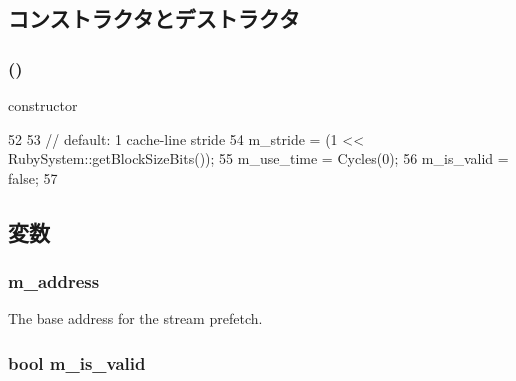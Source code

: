 \subsection{コンストラクタとデストラクタ}
\hypertarget{classPrefetchEntry_a50ec5ab4d2e06f3dbfd82cc2590a574d}{
\subsubsection[{PrefetchEntry}]{ ()}}
\label{classPrefetchEntry_a50ec5ab4d2e06f3dbfd82cc2590a574d}


constructor 


\begin{DoxyCode}
52         {
53             // default: 1 cache-line stride
54             m_stride   = (1 << RubySystem::getBlockSizeBits());
55             m_use_time = Cycles(0);
56             m_is_valid = false;
57         }
\end{DoxyCode}


\subsection{変数}
\hypertarget{classPrefetchEntry_a9fc76d7db60d4f05200f8248a697ea28}{
\subsubsection[{m\_\-address}]{ {\bf m\_\-address}}}
\label{classPrefetchEntry_a9fc76d7db60d4f05200f8248a697ea28}


The base address for the stream prefetch. \hypertarget{classPrefetchEntry_a3163252d457c8ef3a286a8538d7e319f}{
\subsubsection[{m\_\-is\_\-valid}]{\setlength{\rightskip}{0pt plus 5cm}bool {\bf m\_\-is\_\-valid}}}
\label{classPrefetchEntry_a3163252d457c8ef3a286a8538d7e319f}


